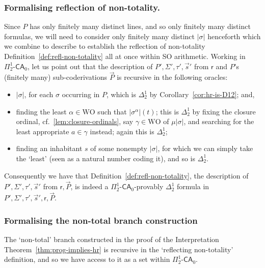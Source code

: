 \documentclass[10pt,a4paper]{amsart}
\theoremstyle{plain}
\theoremstyle{definition}
\newcommand{\anupam}[1]{\todo[color=green]{A: #1}}
\renewcommand{\todo}[1]{}
\renewcommand{\anupam}[1]{}
\theoremstyle{plain}
\theoremstyle{definition} %
\newcommand{\infrule}{\mathsf{r}}
\newcommand{\rrule}{\infrule} %
\newcommand{\Pin}[2]{\Pi^{#1}_{#2}}
\newcommand{\Din}[2]{\Delta^{#1}_{#2}}
\newcommand{\CA}{\mathsf{CA}}
\newcommand{\ca}[1]{#1\text{-}\CA}
\newcommand{\PSCA}{\ca{\Pin 1 2 }_0}
\newcommand{\WO}{\mathrm{WO}}
\newcommand{\hr}[1]{|#1|}
\begin{document}
\subsubsection*{Formalising reflection of non-totality.} 

Since $P$ has only finitely many distinct lines, and so only finitely many distinct formulas, we will need to consider only finitely many distinct $\hr\sigma$ henceforth which we combine to describe to establish the reflection of non-totality Definition~\ref{def:refl-non-totality} all at once within SO arithmetic.
Working in $\PSCA$, let us point out that the description of $P', \Sigma', \tau',\vec s'$ from $\rrule$ and $P$'s (finitely many) sub-coderivations $\vec P$ is recursive in the following oracles:
\begin{itemize}
    \item $\hr\sigma$, for each $\sigma $ occurring in $P$, which is $\Din 1 2 $ by Corollary~\ref{cor:hr-is-D12}; and,
    \item finding the least $\alpha \in \WO$ such that $ \hr{\sigma^\alpha}(t)$; this is $\Din 1 2 $ by fixing the closure ordinal, cf.~\ref{lem:closure-ordinals}, say $\gamma \in \WO$ of $\mu \hr\sigma$, and searching for the least appropriate $a\in \gamma$ instead; again this is $\Din 1 2$;
    \item finding an inhabitant $s$ of some nonempty $\hr\sigma$, for which we can simply take the `least' (seen as a natural number coding it), and so is $\Din 1 2$.
\end{itemize}

Consequently we have that Definition~\ref{def:refl-non-totality}, the description of $P', \Sigma', \tau',\vec s'$ from $\rrule, \vec P$, is indeed a $\PSCA$-provably $\Din 1 2$ formula in $P', \Sigma', \tau',\vec s',\rrule, \vec P$.

\anupam{point out we need KT theorem for $\mu$-right?}

\subsubsection*{Formalising the non-total branch construction}

The `non-total' branch constructed in the proof of the Interpretation Theorem~\ref{thm:prog-implies-hr} is recursive in the `reflecting non-totality' definition, and so we have access to it as a set within $\PSCA$.
\end{document}
